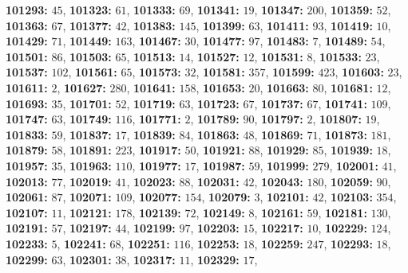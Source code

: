 \textsf{\bfseries 101293:} $45$, \textsf{\bfseries 101323:} $61$, \textsf{\bfseries 101333:} $69$, \textsf{\bfseries 101341:} $19$, \textsf{\bfseries 101347:} $200$, \textsf{\bfseries 101359:} $52$, \textsf{\bfseries 101363:} $67$, \textsf{\bfseries 101377:} $42$, \textsf{\bfseries 101383:} $145$, \textsf{\bfseries 101399:} $63$, \textsf{\bfseries 101411:} $93$, \textsf{\bfseries 101419:} $10$, \textsf{\bfseries 101429:} $71$, \textsf{\bfseries 101449:} $163$, \textsf{\bfseries 101467:} $30$, \textsf{\bfseries 101477:} $97$, \textsf{\bfseries 101483:} $7$, \textsf{\bfseries 101489:} $54$, \textsf{\bfseries 101501:} $86$, \textsf{\bfseries 101503:} $65$, \textsf{\bfseries 101513:} $14$, \textsf{\bfseries 101527:} $12$, \textsf{\bfseries 101531:} $8$, \textsf{\bfseries 101533:} $23$, \textsf{\bfseries 101537:} $102$, \textsf{\bfseries 101561:} $65$, \textsf{\bfseries 101573:} $32$, \textsf{\bfseries 101581:} $357$, \textsf{\bfseries 101599:} $423$, \textsf{\bfseries 101603:} $23$, \textsf{\bfseries 101611:} $2$, \textsf{\bfseries 101627:} $280$, \textsf{\bfseries 101641:} $158$, \textsf{\bfseries 101653:} $20$, \textsf{\bfseries 101663:} $80$, \textsf{\bfseries 101681:} $12$, \textsf{\bfseries 101693:} $35$, \textsf{\bfseries 101701:} $52$, \textsf{\bfseries 101719:} $63$, \textsf{\bfseries 101723:} $67$, \textsf{\bfseries 101737:} $67$, \textsf{\bfseries 101741:} $109$, \textsf{\bfseries 101747:} $63$, \textsf{\bfseries 101749:} $116$, \textsf{\bfseries 101771:} $2$, \textsf{\bfseries 101789:} $90$, \textsf{\bfseries 101797:} $2$, \textsf{\bfseries 101807:} $19$, \textsf{\bfseries 101833:} $59$, \textsf{\bfseries 101837:} $17$, \textsf{\bfseries 101839:} $84$, \textsf{\bfseries 101863:} $48$, \textsf{\bfseries 101869:} $71$, \textsf{\bfseries 101873:} $181$, \textsf{\bfseries 101879:} $58$, \textsf{\bfseries 101891:} $223$, \textsf{\bfseries 101917:} $50$, \textsf{\bfseries 101921:} $88$, \textsf{\bfseries 101929:} $85$, \textsf{\bfseries 101939:} $18$, \textsf{\bfseries 101957:} $35$, \textsf{\bfseries 101963:} $110$, \textsf{\bfseries 101977:} $17$, \textsf{\bfseries 101987:} $59$, \textsf{\bfseries 101999:} $279$, \textsf{\bfseries 102001:} $41$, \textsf{\bfseries 102013:} $77$, \textsf{\bfseries 102019:} $41$, \textsf{\bfseries 102023:} $88$, \textsf{\bfseries 102031:} $42$, \textsf{\bfseries 102043:} $180$, \textsf{\bfseries 102059:} $90$, \textsf{\bfseries 102061:} $87$, \textsf{\bfseries 102071:} $109$, \textsf{\bfseries 102077:} $154$, \textsf{\bfseries 102079:} $3$, \textsf{\bfseries 102101:} $42$, \textsf{\bfseries 102103:} $354$, \textsf{\bfseries 102107:} $11$, \textsf{\bfseries 102121:} $178$, \textsf{\bfseries 102139:} $72$, \textsf{\bfseries 102149:} $8$, \textsf{\bfseries 102161:} $59$, \textsf{\bfseries 102181:} $130$, \textsf{\bfseries 102191:} $57$, \textsf{\bfseries 102197:} $44$, \textsf{\bfseries 102199:} $97$, \textsf{\bfseries 102203:} $15$, \textsf{\bfseries 102217:} $10$, \textsf{\bfseries 102229:} $124$, \textsf{\bfseries 102233:} $5$, \textsf{\bfseries 102241:} $68$, \textsf{\bfseries 102251:} $116$, \textsf{\bfseries 102253:} $18$, \textsf{\bfseries 102259:} $247$, \textsf{\bfseries 102293:} $18$, \textsf{\bfseries 102299:} $63$, \textsf{\bfseries 102301:} $38$, \textsf{\bfseries 102317:} $11$, \textsf{\bfseries 102329:} $17$, 
